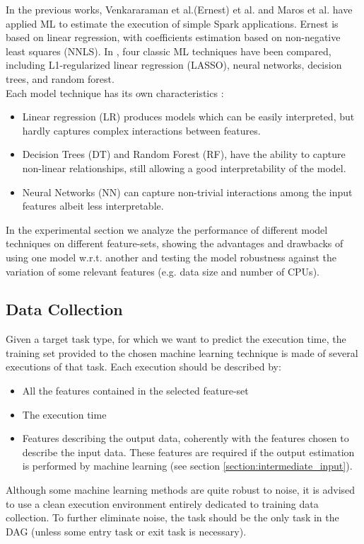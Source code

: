 \documentclass[a4paper, 10pt, conference]{ieeeconf}      %
\begin{document}
In the previous works, Venkararaman et al.(Ernest) et al. \cite{ernest} and Maros et al.\cite{ARDAGNA2019} have applied ML to estimate the execution of simple Spark applications. Ernest
is based on linear regression, with coefficients estimation based on  non-negative least squares (NNLS). 
In \cite{ARDAGNA2019}, four classic ML techniques have been compared, including L1-regularized linear regression (LASSO), neural networks, decision trees, and random forest. \\
Each model technique has its own characteristics \cite{bishop2006pattern}:
\begin{itemize}
    \item Linear regression (LR) produces models which can be easily interpreted, but hardly captures complex interactions between features.
    \item Decision Trees (DT) and Random Forest (RF), have the ability to capture non-linear relationships, still allowing a good interpretability of the model.
    \item Neural Networks (NN) can capture non-trivial interactions among the input features albeit less interpretable.
\end{itemize}

In the experimental section we analyze the performance of different model techniques on different feature-sets, showing the advantages and drawbacks of using one model w.r.t. another and testing the model robustness against the variation of some relevant features  (e.g. data size and number of CPUs).


\subsection{Data Collection}
Given a target task type, for which we want to predict the execution time, the training set provided to the chosen machine learning technique is made of several executions of that task.
Each execution should be described by:
\begin{itemize}
    \item All the features contained in the selected feature-set
    \item The execution time
    \item Features describing the output data, coherently with the features chosen to describe the input data. These features are required if the output estimation is performed by machine learning (see section \ref{section:intermediate_input}).
\end{itemize}
Although some machine learning methods are quite robust to noise, it is advised to use a clean execution environment entirely dedicated to training data collection. To further eliminate noise, the task should be the only task in the DAG (unless some entry task or exit task is necessary).
\end{document}

